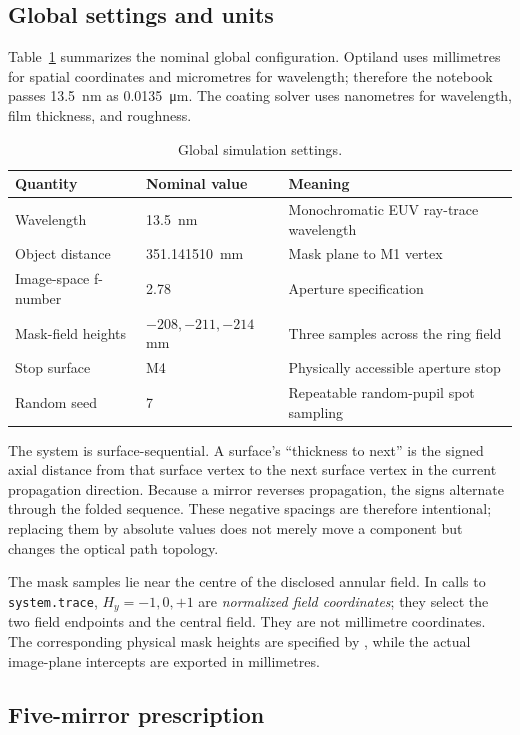 \documentclass[11pt,a4paper]{article}
\begin{document}
\subsection{Global settings and units}

Table~\ref{tab:global} summarizes the nominal global configuration.  Optiland
uses millimetres for spatial coordinates and micrometres for wavelength;
therefore the notebook passes \SI{13.5}{nm} as \SI{0.0135}{\micro\metre}.  The
coating solver uses nanometres for wavelength, film thickness, and roughness.

\begin{table}[H]
\centering
\caption{Global simulation settings.}
\label{tab:global}
\begin{tabular}{@{}lll@{}}
\toprule
Quantity & Nominal value & Meaning \\
\midrule
Wavelength & \SI{13.5}{nm} & Monochromatic EUV ray-trace wavelength \\
Object distance & \SI{351.141510}{mm} & Mask plane to M1 vertex \\
Image-space f-number & 2.78 & Aperture specification \\
Mask-field heights & $-208,-211,-214$ mm & Three samples across the ring field \\
Stop surface & M4 & Physically accessible aperture stop \\
Random seed & 7 & Repeatable random-pupil spot sampling \\
\bottomrule
\end{tabular}
\end{table}

The system is surface-sequential.  A surface's ``thickness to next'' is the
signed axial distance from that surface vertex to the next surface vertex in
the current propagation direction.  Because a mirror reverses propagation,
the signs alternate through the folded sequence.  These negative spacings are
therefore intentional; replacing them by absolute values does not merely move
a component but changes the optical path topology.

The mask samples lie near the centre of the disclosed annular field.  In calls
to \texttt{system.trace}, $H_y=-1,0,+1$ are \emph{normalized field
coordinates}; they select the two field endpoints and the central field.  They
are not millimetre coordinates.  The corresponding physical mask heights are
specified by , while the actual image-plane intercepts are
exported in millimetres.

\subsection{Five-mirror prescription}
\end{document}
